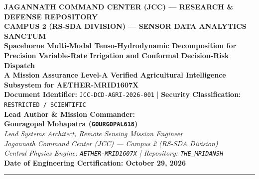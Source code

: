 \documentclass[11pt,a4paper]{article}
\theoremstyle{definition}
\theoremstyle{remark}
\begin{document}
\begin{center}
    {\Large \textbf{JAGANNATH COMMAND CENTER (JCC) --- RESEARCH \& DEFENSE REPOSITORY}}\\[0.2cm]
    {\large \textbf{CAMPUS 2 (RS-SDA DIVISION) --- SENSOR DATA ANALYTICS SANCTUM}}\\[0.4cm]
    {\LARGE \textbf{Spaceborne Multi-Modal Tenso-Hydrodynamic Decomposition for Precision Variable-Rate Irrigation and Conformal Decision-Risk Dispatch}}\\[0.3cm]
    {\large \textbf{A Mission Assurance Level-A Verified Agricultural Intelligence Subsystem for AETHER-MRID1607X}}\\[0.4cm]
    \textbf{Document Identifier:} \texttt{JCC-DCD-AGRI-2026-001} \quad | \quad \textbf{Security Classification:} \texttt{RESTRICTED / SCIENTIFIC} \\[0.3cm]
    
    \textbf{Lead Author \& Mission Commander:}\\
    \textbf{Gouragopal Mohapatra (\texttt{GOURGOPAL618})}\\
    \textit{Lead Systems Architect, Remote Sensing Mission Engineer}\\
    \textit{Jagannath Command Center (JCC) --- Campus 2 (RS-SDA Division)}\\
    \textit{Central Physics Engine: \texttt{AETHER-MRID1607X} \quad | \quad Repository: \texttt{THE\_MRIDANSH}}\\[0.2cm]
    \textbf{Date of Engineering Certification: October 29, 2026}
\end{center}

\vspace{0.4cm}
\hrule
\vspace{0.4cm}
\end{document}
